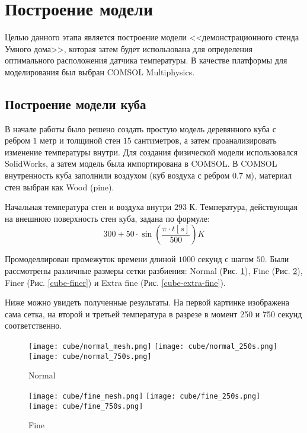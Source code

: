 \graphicspath{{./images/model}}
\section{Построение модели}

Целью данного этапа является построение модели <<демонстрационного стенда Умного дома>>, которая затем будет использована для определения оптимального расположения датчика температуры. В качестве платформы для моделирования был выбран COMSOL Multiphysics.


\subsection{Построение модели куба}

В начале работы было решено создать простую модель деревянного куба с ребром $1$ метр и толщиной стен $15$ сантиметров, а затем проанализировать изменение температуры внутри. Для создания физической модели использовался SolidWorks, а затем модель была импортирована в COMSOL. В COMSOL внутренность куба заполнили воздухом (куб воздуха с ребром $0.7$ м), материал стен выбран как Wood (pine).

Начальная температура стен и воздуха внутри $293$ К. Температура, действующая на внешнюю поверхность стен куба, задана по формуле:
\[300 + 50 \cdot \sin(\frac{\pi \cdot t[s]}{500}) K\]

Промоделлирован промежуток времени длиной $1000$ секунд с шагом $50$.
Были рассмотрены различные размеры сетки разбиения: Normal (Рис. \ref{cube-normal}), Fine (Рис. \ref{cube-fine}), Finer (Рис. \ref{cube-finer}) и Extra fine (Рис. \ref{cube-extra-fine}).

Ниже можно увидеть полученные результаты. На первой картинке изображена сама сетка, на второй и третьей температура в разрезе в момент 250 и 750 секунд соответственно.

\begin{figure}[H]
\texttt{[image: cube/normal\_mesh.png]}\hfill
\texttt{[image: cube/normal\_250s.png]}\hfill
\texttt{[image: cube/normal\_750s.png]}\hfill
\caption{Normal}
\label{cube-normal}
\end{figure}

\begin{figure}[H]
\texttt{[image: cube/fine\_mesh.png]}\hfill
\texttt{[image: cube/fine\_250s.png]}\hfill
\texttt{[image: cube/fine\_750s.png]}\hfill
\caption{Fine}
\label{cube-fine}
\end{figure}

